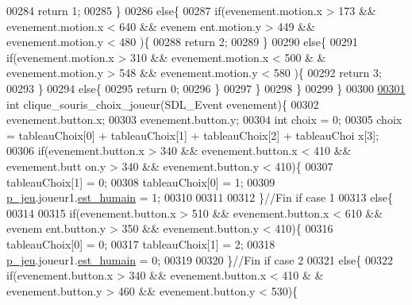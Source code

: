 \begin{DoxyCode}
00284                 \textcolor{keywordflow}{return} 1;
00285         \}
00286         \textcolor{keywordflow}{else}\{
00287                 \textcolor{keywordflow}{if}(evenement.motion.x > 173 && evenement.motion.x < 640 && evenem
      ent.motion.y > 449 && evenement.motion.y < 480 )\{
00288                         \textcolor{keywordflow}{return} 2;
00289                 \}
00290                 \textcolor{keywordflow}{else}\{
00291                         \textcolor{keywordflow}{if}(evenement.motion.x > 310 && evenement.motion.x < 500 &
      & evenement.motion.y > 548 && evenement.motion.y < 580 )\{
00292                                 \textcolor{keywordflow}{return} 3;
00293                         \}
00294                         \textcolor{keywordflow}{else}\{
00295                                 \textcolor{keywordflow}{return} 0;
00296                         \}
00297                 \}
00298         \}
00299 \}
00300 
\hypertarget{fonction_interface_8c_source_l00301}{}\hyperlink{fonction_interface_8h_af439094b4dbb8cac323aaba6130a3cfb}{00301} \textcolor{keywordtype}{int} clique\_souris\_choix\_joueur(SDL\_Event evenement)\{
00302         evenement.button.x;
00303         evenement.button.y;
00304         \textcolor{keywordtype}{int} choix = 0;
00305         choix = tableauChoix[0] + tableauChoix[1] + tableauChoix[2] + tableauChoi
      x[3];
00306         \textcolor{keywordflow}{if}(evenement.button.x > 340 && evenement.button.x < 410 && evenement.butt
      on.y > 340 && evenement.button.y < 410)\{
00307                 tableauChoix[1] = 0;
00308                 tableauChoix[0] = 1;
00309                 \hyperlink{moteur_8h_a3efa8d0f7c65daedc584dc8db048e62c}{p_jeu}.joueur1.\hyperlink{structjoueur_a9419778626112832ee0e59df49145a39}{est_humain} = 1;
00310 
00311 
00312         \}\textcolor{comment}{//Fin if case 1}
00313         \textcolor{keywordflow}{else}\{
00314 
00315                 \textcolor{keywordflow}{if}(evenement.button.x > 510 && evenement.button.x < 610 && evenem
      ent.button.y > 350 && evenement.button.y < 410)\{
00316                         tableauChoix[0] = 0;
00317                         tableauChoix[1] = 2;
00318                         \hyperlink{moteur_8h_a3efa8d0f7c65daedc584dc8db048e62c}{p_jeu}.joueur1.\hyperlink{structjoueur_a9419778626112832ee0e59df49145a39}{est_humain} = 0;
00319 
00320                 \}\textcolor{comment}{//Fin if case 2}
00321                 \textcolor{keywordflow}{else}\{
00322                         \textcolor{keywordflow}{if}(evenement.button.x > 340 && evenement.button.x < 410 &
      & evenement.button.y > 460 && evenement.button.y < 530)\{

\end{DoxyCode}
